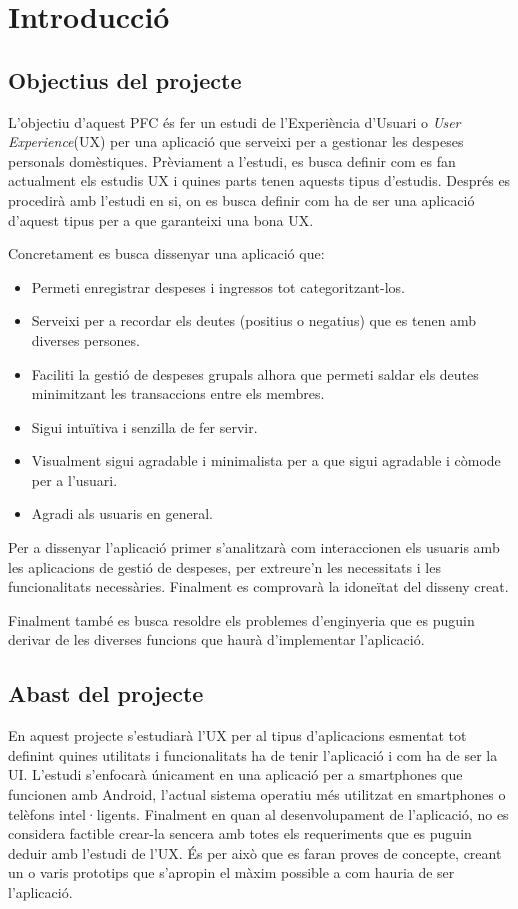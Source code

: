 \chapter{Introducció}

\section{Objectius del projecte}
L'objectiu d'aquest \ac{PFC} és fer un estudi de l'Experiència d'Usuari o \textit{User Experience}(UX) per una aplicació que serveixi per a gestionar les despeses personals domèstiques. Prèviament a l'estudi, es busca definir com es fan actualment els estudis \ac{UX} i quines parts tenen aquests tipus d'estudis. Després es procedirà amb l'estudi en si, on es busca definir com ha de ser una aplicació d'aquest tipus per a que garanteixi una bona \ac{UX}.

Concretament es busca dissenyar una aplicació que:
\begin{itemize}
\item Permeti enregistrar despeses i ingressos tot categoritzant-los.
\item Serveixi per a recordar els deutes (positius o negatius) que es tenen amb diverses persones.
\item Faciliti la gestió de despeses grupals alhora que permeti saldar els deutes minimitzant les transaccions entre els membres.
\item Sigui intuïtiva i senzilla de fer servir.
\item Visualment sigui agradable i minimalista per a que sigui agradable i còmode per a l'usuari.
\item Agradi als usuaris en general.
\end{itemize}

Per a dissenyar l'aplicació primer s'analitzarà com interaccionen els usuaris amb les aplicacions de gestió de despeses, per extreure'n les necessitats i les funcionalitats necessàries. Finalment es comprovarà la idoneïtat del disseny creat.

Finalment també es busca resoldre els problemes d'enginyeria que es puguin derivar de les diverses funcions que haurà d'implementar l'aplicació. 

\section{Abast del projecte}
En aquest projecte s'estudiarà l'\ac{UX} per al tipus d'aplicacions esmentat tot definint quines utilitats i funcionalitats ha de tenir l'aplicació i com ha de ser la \ac{UI}. L'estudi s'enfocarà únicament en una aplicació per a \glspl{smartphone} que funcionen amb \gls{Android}, l'actual sistema operatiu més utilitzat\cite{Android_OS} en \glspl{smartphone} o telèfons intel·ligents. 
Finalment en quan al desenvolupament de l'aplicació, no es considera factible crear-la sencera amb totes els requeriments que es puguin deduir amb l'estudi de l'\ac{UX}. És per això que es faran proves de concepte, creant un o varis prototips que s'apropin el màxim possible a com hauria de ser l'aplicació. 